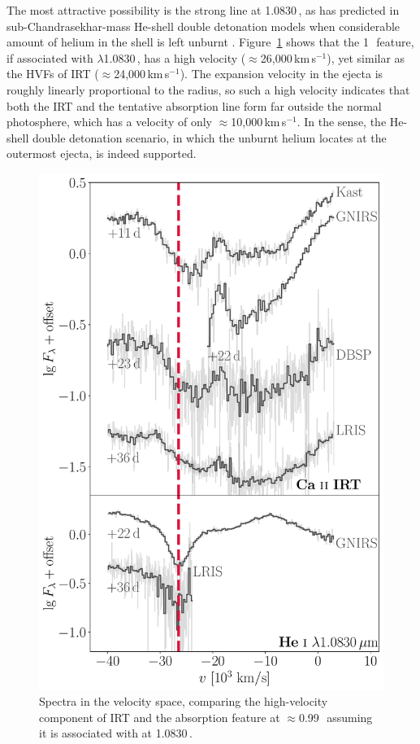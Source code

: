 \documentclass[twocolumn]{aastex631}
\begin{document}
The most attractive possibility is the strong  line at 1.0830\,\micron, as has predicted in sub-Chandrasekhar-mass He-shell double detonation models when considerable amount of helium in the shell is left unburnt \citep{Boyle2017_Helium}. Figure~\ref{fig:hvf_comp} shows that the 1\,\micron\ feature, if associated with  $\lambda$1.0830\,\micron, has a high velocity ($\approx$26,000\,km\,s$^{-1}$), yet similar as the HVFs of  IRT ($\approx$24,000\,km\,s$^{-1}$). The expansion velocity in the ejecta is roughly linearly proportional to the radius, so such a high velocity indicates that both the  IRT and the tentative  absorption line form far outside the normal photosphere, which has a velocity of only $\approx$10,000\,km\,s$^{-1}$. In the sense, the He-shell double detonation scenario, in which the unburnt helium locates at the outermost ejecta, is indeed supported.
\begin{figure}
    \centering
    \includegraphics[width=\linewidth]{CaII_HeI_hvf.pdf}
    \caption{Spectra in the velocity space, comparing the high-velocity component of  IRT and the absorption feature at $\approx$0.99\,\micron\ assuming it is associated with  at 1.0830\,\micron.}
    \label{fig:hvf_comp}
\end{figure}
\end{document}
